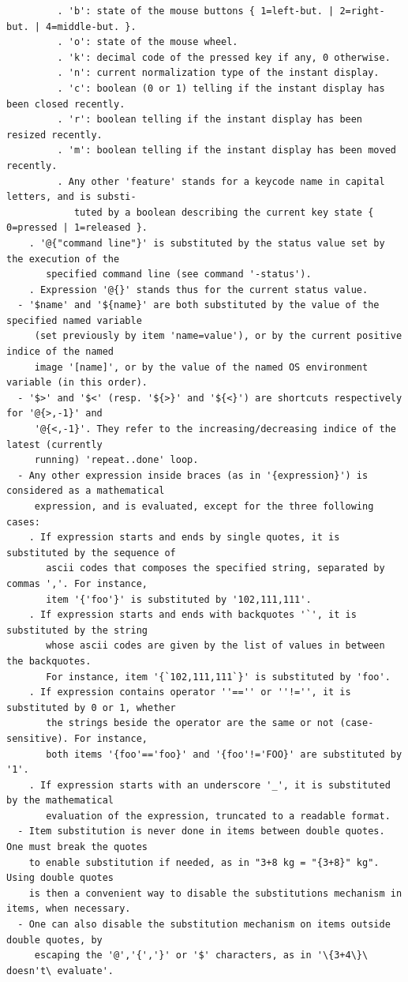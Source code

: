 \documentclass[a4paper,11pt,twoside]{book}
\begin{document}
\begin{lstlisting}
         . 'b': state of the mouse buttons { 1=left-but. | 2=right-but. | 4=middle-but. }. 
         . 'o': state of the mouse wheel. 
         . 'k': decimal code of the pressed key if any, 0 otherwise. 
         . 'n': current normalization type of the instant display. 
         . 'c': boolean (0 or 1) telling if the instant display has been closed recently. 
         . 'r': boolean telling if the instant display has been resized recently. 
         . 'm': boolean telling if the instant display has been moved recently. 
         . Any other 'feature' stands for a keycode name in capital letters, and is substi- 
            tuted by a boolean describing the current key state { 0=pressed | 1=released }. 
    . '@{"command line"}' is substituted by the status value set by the execution of the 
       specified command line (see command '-status'). 
    . Expression '@{}' stands thus for the current status value. 
  - '$name' and '${name}' are both substituted by the value of the specified named variable 
     (set previously by item 'name=value'), or by the current positive indice of the named 
     image '[name]', or by the value of the named OS environment variable (in this order). 
  - '$>' and '$<' (resp. '${>}' and '${<}') are shortcuts respectively for '@{>,-1}' and 
     '@{<,-1}'. They refer to the increasing/decreasing indice of the latest (currently 
     running) 'repeat..done' loop. 
  - Any other expression inside braces (as in '{expression}') is considered as a mathematical 
     expression, and is evaluated, except for the three following cases: 
    . If expression starts and ends by single quotes, it is substituted by the sequence of 
       ascii codes that composes the specified string, separated by commas ','. For instance, 
       item '{'foo'}' is substituted by '102,111,111'. 
    . If expression starts and ends with backquotes '`', it is substituted by the string 
       whose ascii codes are given by the list of values in between the backquotes. 
       For instance, item '{`102,111,111`}' is substituted by 'foo'. 
    . If expression contains operator ''=='' or ''!='', it is substituted by 0 or 1, whether 
       the strings beside the operator are the same or not (case-sensitive). For instance, 
       both items '{foo'=='foo}' and '{foo'!='FOO}' are substituted by '1'. 
    . If expression starts with an underscore '_', it is substituted by the mathematical 
       evaluation of the expression, truncated to a readable format. 
  - Item substitution is never done in items between double quotes. One must break the quotes 
    to enable substitution if needed, as in "3+8 kg = "{3+8}" kg". Using double quotes 
    is then a convenient way to disable the substitutions mechanism in items, when necessary. 
  - One can also disable the substitution mechanism on items outside double quotes, by 
     escaping the '@','{','}' or '$' characters, as in '\{3+4\}\ doesn't\ evaluate'.
\end{lstlisting}
\normalsize
\end{document}

